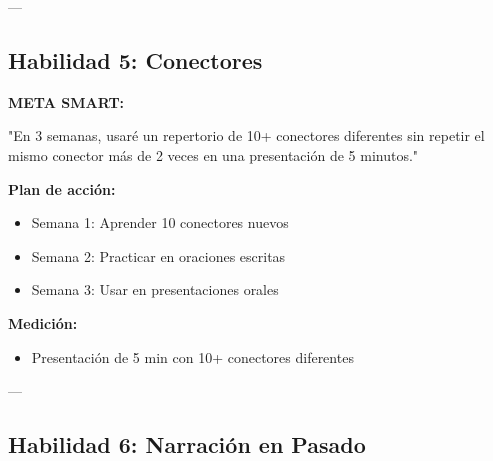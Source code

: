 \documentclass[a4paper,11pt]{article}
\begin{document}
\vspace{0.2cm}

---

\vspace{0.2cm}

\subsection{Habilidad 5: Conectores}

\vspace{0.2cm}

\textbf{META SMART:}

"En 3 semanas, usaré un repertorio de 10+ conectores diferentes sin repetir el mismo conector más de 2 veces en una presentación de 5 minutos."

\vspace{0.2cm}

\textbf{Plan de acción:}

\begin{itemize}

  \item Semana 1: Aprender 10 conectores nuevos

  \item Semana 2: Practicar en oraciones escritas

  \item Semana 3: Usar en presentaciones orales

\end{itemize}

\vspace{0.2cm}

\textbf{Medición:}

\begin{itemize}

  \item [ ] Presentación de 5 min con 10+ conectores diferentes

\end{itemize}

\vspace{0.2cm}

---

\vspace{0.2cm}

\subsection{Habilidad 6: Narración en Pasado}

\vspace{0.2cm}
\end{document}

